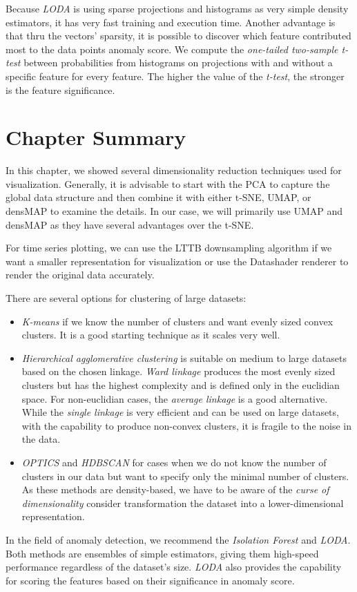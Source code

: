 Because \textit{LODA} is using sparse projections and histograms as very simple density estimators, it has very fast training and execution time. Another advantage is that thru the vectors' sparsity, it is possible to discover which feature contributed most to the data points anomaly score. We compute the \textit{one-tailed two-sample t-test} between probabilities from histograms on projections with and without a specific feature for every feature. The higher the value of the \textit{t-test}, the stronger is the feature significance.

\section{Chapter Summary}
In this chapter, we showed several dimensionality reduction techniques used for visualization. Generally, it is advisable to start with the PCA to capture the global data structure and then combine it with either t-SNE, UMAP, or densMAP to examine the details. In our case, we will primarily use UMAP and densMAP as they have several advantages over the t-SNE.

For time series plotting, we can use the LTTB downsampling algorithm if we want a smaller representation for visualization or use the Datashader renderer to render the original data accurately.

There are several options for clustering of large datasets:
\begin{itemize}
    \item \textit{K-means} if we know the number of clusters and want evenly sized convex clusters. It is a good starting technique as it scales very well.
    \item \textit{Hierarchical agglomerative clustering} is suitable on medium to large datasets based on the chosen linkage. \textit{Ward linkage} produces the most evenly sized clusters but has the highest complexity and is defined only in the euclidian space. For non-euclidian cases, the \textit{average linkage} is a good alternative. While the \textit{single linkage} is very efficient and can be used on large datasets, with the capability to produce non-convex clusters, it is fragile to the noise in the data.
    \item \textit{OPTICS} and \textit{HDBSCAN} for cases when we do not know the number of clusters in our data but want to specify only the minimal number of clusters. As these methods are density-based, we have to be aware of the \textit{curse of dimensionality} consider transformation the dataset into a lower-dimensional representation.
\end{itemize}

In the field of anomaly detection, we recommend the \textit{Isolation Forest} and \textit{LODA}. Both methods are ensembles of simple estimators, giving them high-speed performance regardless of the dataset's size. \textit{LODA} also provides the capability for scoring the features based on their significance in anomaly score.

